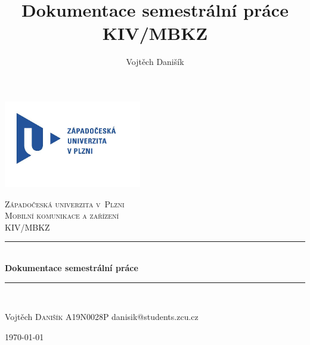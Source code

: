 \documentclass[12pt, a4paper]{article}
\title{\textbf{Dokumentace semestrální práce} \\KIV/MBKZ}
\author{Vojtěch Danišík}
\begin{document}
\begin{titlepage} 
	\newcommand{\HRule}{\rule{\linewidth}{0.5mm}} 
	\begin{center}
	\includegraphics[width=6cm]{img/logo}\\
	\end{center}
	\textsc{\LARGE Západočeská univerzita v~Plzni}\\[1.5cm] 	
	\textsc{\Large Mobilní komunikace a zařízení}\\[0.5cm] 
	\textsc{\large KIV/MBKZ}\\[0.5cm] 
	\HRule\\[0.4cm]
	{\huge\bfseries Dokumentace semestrální práce}\\[0.4cm] 
	\HRule\\[1.5cm]

	\begin{minipage}{0.4\textwidth}
		\begin{flushleft}
			\large
			Vojtěch \textsc{Danišík}\newline
			A19N0028P\newline
			danisik@students.zcu.cz
		\end{flushleft}
	\end{minipage}
	\vfill\vfill\vfill
	\begin{flushright}
	{\large\today}
	\end{flushright}
	\vfill 
\end{titlepage}
\newpage
\tableofcontents
\newpage
\end{document}
